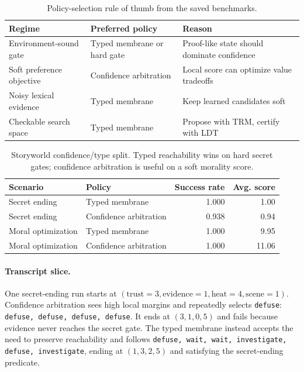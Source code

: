 \documentclass[11pt]{article}
\begin{document}
\begin{table}[t]
\centering
\begin{tabular}{lll}
\toprule
Regime & Preferred policy & Reason \\
\midrule
Environment-sound gate & Typed membrane or hard gate & Proof-like state should dominate confidence \\
Soft preference objective & Confidence arbitration & Local score can optimize value tradeoffs \\
Noisy lexical evidence & Typed membrane & Keep learned candidates soft \\
Checkable search space & Typed membrane & Propose with TRM, certify with LDT \\
\bottomrule
\end{tabular}
\caption{Policy-selection rule of thumb from the saved benchmarks.}
\label{tab:policy-selection}
\end{table}

\begin{table}[t]
\centering
\begin{tabular}{llrr}
\toprule
Scenario & Policy & Success rate & Avg. score \\
\midrule
Secret ending & Typed membrane & 1.000 & 1.00 \\
Secret ending & Confidence arbitration & 0.938 & 0.94 \\
Moral optimization & Typed membrane & 1.000 & 9.95 \\
Moral optimization & Confidence arbitration & 1.000 & 11.06 \\
\bottomrule
\end{tabular}
\caption{Storyworld confidence/type split. Typed reachability wins on hard secret gates; confidence arbitration is useful on a soft morality score.}
\label{tab:storyworld-confidence-type}
\end{table}

\paragraph{Transcript slice.}
One secret-ending run starts at $(\text{trust}=3,\text{evidence}=1,\text{heat}=4,\text{scene}=1)$. Confidence arbitration sees high local margins and repeatedly selects \texttt{defuse}: \texttt{defuse, defuse, defuse, defuse}. It ends at $(3,1,0,5)$ and fails because evidence never reaches the secret gate. The typed membrane instead accepts the need to preserve reachability and follows \texttt{defuse, wait, wait, investigate, defuse, investigate}, ending at $(1,3,2,5)$ and satisfying the secret-ending predicate.
\end{document}
